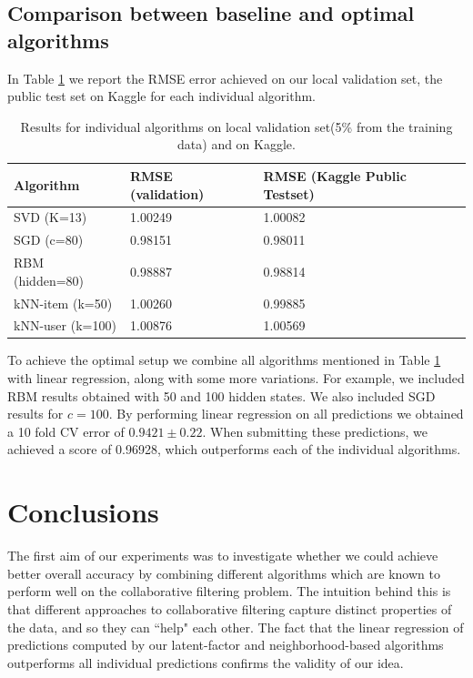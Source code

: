 \documentclass[10pt,conference,compsocconf]{IEEEtran}
\begin{document}
	\subsection{Comparison between baseline and optimal algorithms}
	In Table \ref{tab:res} we report the RMSE error achieved on our local validation set, the public test set on Kaggle for each individual algorithm.
	\begin{table}
		\begin{tabular}{ |p{2.8cm}||p{2.4cm}|p{2.3cm}|  }
			\hline
			Algorithm & RMSE (validation) & RMSE (Kaggle Public Testset) \\ [0.5ex] 
			\hline\hline
			SVD (K=13) & 1.00249 & 1.00082 \\ 
			\hline
			SGD (c=80) & 0.98151
			 &  0.98011 \\
			\hline
			RBM (hidden=80) & 0.98887 & 0.98814 \\
			\hline
			kNN-item (k=50) & 1.00260 & 0.99885 \\ 
			\hline
			kNN-user (k=100) & 1.00876 & 1.00569 \\ [1ex] 
			\hline
		\end{tabular}
	\caption{Results for individual algorithms on local validation set(5\% from the training data) and on Kaggle. }
		\label{tab:res}
	\end{table}
	
	To achieve the optimal setup we combine all algorithms mentioned in Table \ref{tab:res} with linear regression, along with some more variations. For example, we included RBM results obtained with 50 and 100 hidden states. We also included SGD results for $c = 100$. By performing linear regression on all predictions we obtained a 10 fold CV error of $0.9421\pm{0.22}$. When submitting these predictions, we achieved a score of 0.96928, which outperforms each of the individual algorithms.
	
	\section{Conclusions}
	\label{sec:conclusions}
	
	The first aim of our experiments was to investigate whether we could achieve better overall accuracy by combining different algorithms which are known to perform well on the collaborative filtering problem. The intuition behind this is that different approaches to collaborative filtering capture distinct properties of the data, and so they can ``help" each other. The fact that the linear regression of predictions computed by our latent-factor and neighborhood-based algorithms outperforms all individual predictions confirms the validity of our idea.
	
\end{document}
